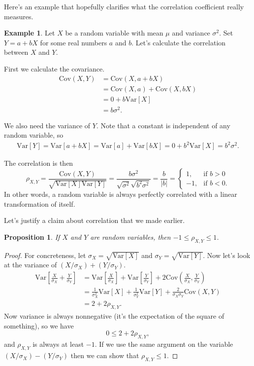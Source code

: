 \documentclass[12pt]{article}
\theoremstyle{plain}
\newtheorem{proposition}[theorem]{Proposition}
\theoremstyle{definition}
\newtheorem{example}[theorem]{Example}
\theoremstyle{remark}
\newcommand{\Var}{\ensuremath{\textrm{Var}}}
\newcommand{\Cov}{\ensuremath{\textrm{Cov}}}
\begin{document}
Here's an example that hopefully clarifies what the correlation coefficient really measures.
\begin{example}
    Let $X$ be a random variable with mean $\mu$ and variance $\sigma^2$.
    Set $Y = a+bX$ for some real numbers $a$ and $b$.
    Let's calculate the correlation between $X$ and $Y$.

    First we calculate the covariance.
    \begin{align*}
        \Cov(X,Y) &= \Cov(X, a+bX)\\
        &= \Cov(X, a) + \Cov(X, bX)\\
        &= 0 + b\Var[X]\\
        &= b\sigma^2.
    \end{align*}

    We also need the variance of $Y$.
    Note that a constant is independent of any random variable, so
    \begin{align*}
        \Var[Y] = \Var[a+bX] = \Var[a] + \Var[bX] = 0+b^2\Var[X] = b^2\sigma^2.
    \end{align*}

    The correlation is then
    \[
        \rho_{X,Y} = \frac{\Cov(X,Y)}{\sqrt{\Var[X]\Var[Y]}} = \frac{b\sigma^2}{\sqrt{\sigma^2}\sqrt{b^2\sigma^2}} = \frac{b}{|b|} = \begin{cases}
            1,&\text{if }b>0\\
            -1,&\text{if }b<0.
        \end{cases}
    \]
    In other words, a random variable is always perfectly correlated with a linear transformation of itself.
\end{example}

Let's justify a claim about correlation that we made earlier.
\begin{proposition}
    If $X$ and $Y$ are random variables, then $-1\leq \rho_{X,Y} \leq 1$.
\end{proposition}
\begin{proof}
    For concreteness, let $\sigma_X = \sqrt{\Var[X]}$ and $\sigma_Y = \sqrt{\Var[Y]}$.
    Now let's look at the variance of $(X/\sigma_X)+(Y/\sigma_Y)$.
    \begin{align*}
        \Var\left[\frac{X}{\sigma_X} + \frac{Y}{\sigma_Y}\right] &= \Var\left[\frac{X}{\sigma_X}\right] + \Var\left[\frac{Y}{\sigma_Y}\right] + 2\Cov\left(\frac{X}{\sigma_X}, \frac{Y}{\sigma_Y}\right)\\
        &= \frac{1}{\sigma_X^2}\Var[X] + \frac{1}{\sigma_Y^2}\Var[Y] + \frac{2}{\sigma_X\sigma_Y}\Cov(X,Y)\\
        &= 2 + 2\rho_{X,Y}.
    \end{align*}
    Now variance is always nonnegative (it's the expectation of the square of something), so we have
    \[
        0\leq 2+2\rho_{X,Y},
    \]
    and $\rho_{X,Y}$ is always at least $-1$.
    If we use the same argument on the variable $(X/\sigma_X)-(Y/\sigma_Y)$ then we can show that $\rho_{X,Y}\leq 1$.
\end{proof}
\end{document}
